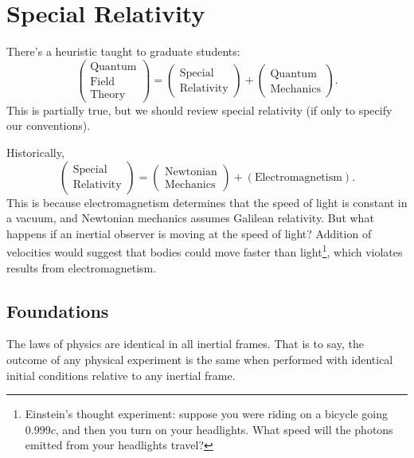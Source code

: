 \chapter{Special Relativity}

\M
There's a heuristic taught to graduate students:
\begin{equation}
\begin{pmatrix}\mbox{Quantum}\\
\mbox{Field}\\
\mbox{Theory}
\end{pmatrix}
=
\begin{pmatrix}\mbox{Special}\\
\mbox{Relativity}
\end{pmatrix}
+\begin{pmatrix}\mbox{Quantum}\\
\mbox{Mechanics}
\end{pmatrix}.
\end{equation}
This is partially true, but we should review special relativity (if only
to specify our conventions).

Historically, 
\begin{equation}
\begin{pmatrix}\mbox{Special}\\
\mbox{Relativity}
\end{pmatrix}
=
\begin{pmatrix}\mbox{Newtonian}\\
\mbox{Mechanics}
\end{pmatrix}
+
(\mbox{Electromagnetism}).
\end{equation}
This is because electromagnetism determines that the speed of light is
constant in a vacuum, and Newtonian mechanics assumes Galilean
relativity. But what happens if an inertial observer is moving at the
speed of light? Addition of velocities would suggest that bodies could
move faster than light\footnote{Einstein's thought experiment: suppose
you were riding on a bicycle going $0.999c$, and then you turn on your
headlights. What speed will the photons emitted from your headlights
travel?}, which violates results from electromagnetism.

\section{Foundations}

\begin{axiom}
The laws of physics are identical in all inertial frames. That is to
say, the outcome of any physical experiment is the same when performed
with identical initial conditions relative to any inertial frame.
\end{axiom}

